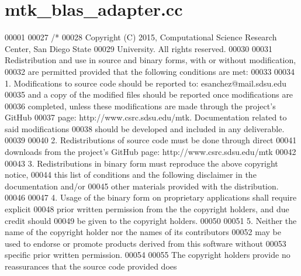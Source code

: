 \hypertarget{mtk__blas__adapter_8cc_source}{\section{mtk\+\_\+blas\+\_\+adapter.\+cc}
\label{mtk__blas__adapter_8cc_source}
}

\begin{DoxyCode}
00001 
00027 \textcolor{comment}{/*}
00028 \textcolor{comment}{Copyright (C) 2015, Computational Science Research Center, San Diego State}
00029 \textcolor{comment}{University. All rights reserved.}
00030 \textcolor{comment}{}
00031 \textcolor{comment}{Redistribution and use in source and binary forms, with or without modification,}
00032 \textcolor{comment}{are permitted provided that the following conditions are met:}
00033 \textcolor{comment}{}
00034 \textcolor{comment}{1. Modifications to source code should be reported to: esanchez@mail.sdsu.edu}
00035 \textcolor{comment}{and a copy of the modified files should be reported once modifications are}
00036 \textcolor{comment}{completed, unless these modifications are made through the project's GitHub}
00037 \textcolor{comment}{page: http://www.csrc.sdsu.edu/mtk. Documentation related to said modifications}
00038 \textcolor{comment}{should be developed and included in any deliverable.}
00039 \textcolor{comment}{}
00040 \textcolor{comment}{2. Redistributions of source code must be done through direct}
00041 \textcolor{comment}{downloads from the project's GitHub page: http://www.csrc.sdsu.edu/mtk}
00042 \textcolor{comment}{}
00043 \textcolor{comment}{3. Redistributions in binary form must reproduce the above copyright notice,}
00044 \textcolor{comment}{this list of conditions and the following disclaimer in the documentation and/or}
00045 \textcolor{comment}{other materials provided with the distribution.}
00046 \textcolor{comment}{}
00047 \textcolor{comment}{4. Usage of the binary form on proprietary applications shall require explicit}
00048 \textcolor{comment}{prior written permission from the the copyright holders, and due credit should}
00049 \textcolor{comment}{be given to the copyright holders.}
00050 \textcolor{comment}{}
00051 \textcolor{comment}{5. Neither the name of the copyright holder nor the names of its contributors}
00052 \textcolor{comment}{may be used to endorse or promote products derived from this software without}
00053 \textcolor{comment}{specific prior written permission.}
00054 \textcolor{comment}{}
00055 \textcolor{comment}{The copyright holders provide no reassurances that the source code provided does}

\end{DoxyCode}
